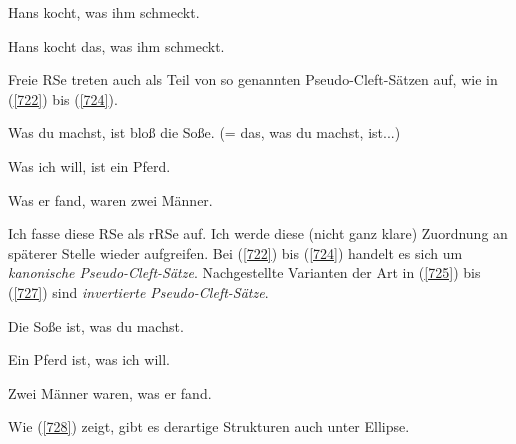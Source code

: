 \begin{exe}
	\ex\label{720} 
	Hans kocht, was ihm schmeckt.
\end{exe}

\begin{exe}
	\ex\label{721} 
	Hans kocht das, was ihm schmeckt.
	\hfill\hbox{\citet[62]{Rothweiler1993}}
\end{exe}
Freie RSe treten auch als Teil von so genannten Pseudo-Cleft-Sätzen  auf, wie in (\ref{722}) bis (\ref{724}).

\begin{exe}
	\ex\label{722} 
	Was du machst, ist bloß die Soße. (= das, was du machst, ist...)
\end{exe}

\begin{exe}
	\ex\label{723} 
	Was ich will, ist ein Pferd.
\end{exe}

\begin{exe}
	\ex\label{724} 
	Was er fand, waren zwei Männer.
	\hfill\hbox{\citet[360]{Lehmann1984}}
\end{exe}
Ich fasse diese RSe als rRSe auf. Ich werde diese (nicht ganz klare) Zuordnung an späterer Stelle wieder aufgreifen. Bei (\ref{722}) bis (\ref{724}) handelt es sich um  \textit{kanonische Pseudo-Cleft-Sätze}. Nachgestellte Varianten der Art in (\ref{725}) bis (\ref{727}) sind  \textit{invertierte Pseudo-Cleft-Sätze}. 

\begin{exe}
	\ex\label{725} 
	Die Soße ist, was du machst.
\end{exe}

\begin{exe}
	\ex\label{726} 
	Ein Pferd ist, was ich will.
\end{exe}

\begin{exe}
	\ex\label{727} 
	Zwei Männer waren, was er fand.
\end{exe}	
Wie (\ref{728}) zeigt, gibt es derartige Strukturen auch unter Ellipse.

